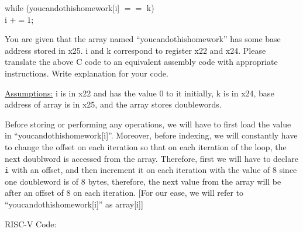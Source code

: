 \documentclass[addpoints]{exam}
\begin{document}
\begin{sloppypar}
\begin{questions}
    while (you\underline{\hspace{2mm}}can\underline{\hspace{2mm}}do\underline{\hspace{2mm}}this\underline{\hspace{2mm}}homework[i] $ == $ k) \\ \hspace*{12mm} i $ += 1 $;

    You are given that the array named ``you\underline{\hspace{2mm}}can\underline{\hspace{2mm}}do\underline{\hspace{2mm}}this\underline{\hspace{2mm}}homework'' has some base address stored in x25. i and k correspond to register x22 and x24. Please translate the above C code to an equivalent assembly code with appropriate instructions. Write explanation for your code.
    \begin{solution}

        \underline{Assumptions:} i is in x22 and has the value 0 to it initially, k is in x24, base address of array is in x25, and the array stores doublewords.

        Before storing or performing any operations, we will have to first load the value in ``you\underline{\hspace{2mm}}can\underline{\hspace{2mm}}do\underline{\hspace{2mm}}this\underline{\hspace{2mm}}homework[i]''. Moreover, before indexing, we will constantly have to change the offset on each iteration so that on each iteration of the loop, the next doublword is accessed from the array. Therefore, first we will have to declare \texttt{i} with an offset, and then increment it on each iteration with the value of 8 since one doubleword is of 8 bytes, therefore, the next value from the array will be after an offset of 8 on each iteration. [For our ease, we will refer to ``you\underline{\hspace{2mm}}can\underline{\hspace{2mm}}do\underline{\hspace{2mm}}this\underline{\hspace{2mm}}homework[i]'' as array[i]]

        RISC-V Code: 


\end{solution}
\end{questions}
\end{sloppypar}
\end{document}
